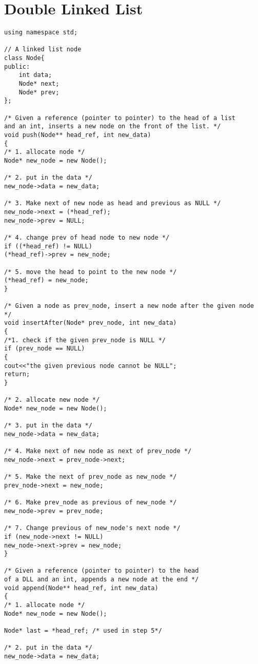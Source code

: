 \section{Double Linked List}
\begin{lstlisting}
using namespace std;

// A linked list node 
class Node{ 
public:
	int data; 
	Node* next; 
	Node* prev; 
}; 

/* Given a reference (pointer to pointer) to the head of a list 
and an int, inserts a new node on the front of the list. */
void push(Node** head_ref, int new_data) 
{ 
/* 1. allocate node */
Node* new_node = new Node(); 

/* 2. put in the data */
new_node->data = new_data; 

/* 3. Make next of new node as head and previous as NULL */
new_node->next = (*head_ref); 
new_node->prev = NULL; 

/* 4. change prev of head node to new node */
if ((*head_ref) != NULL) 
(*head_ref)->prev = new_node; 

/* 5. move the head to point to the new node */
(*head_ref) = new_node; 
} 

/* Given a node as prev_node, insert a new node after the given node */
void insertAfter(Node* prev_node, int new_data) 
{ 
/*1. check if the given prev_node is NULL */
if (prev_node == NULL) 
{ 
cout<<"the given previous node cannot be NULL"; 
return; 
} 

/* 2. allocate new node */
Node* new_node = new Node();

/* 3. put in the data */
new_node->data = new_data; 

/* 4. Make next of new node as next of prev_node */
new_node->next = prev_node->next; 

/* 5. Make the next of prev_node as new_node */
prev_node->next = new_node; 

/* 6. Make prev_node as previous of new_node */
new_node->prev = prev_node; 

/* 7. Change previous of new_node's next node */
if (new_node->next != NULL) 
new_node->next->prev = new_node; 
} 

/* Given a reference (pointer to pointer) to the head 
of a DLL and an int, appends a new node at the end */
void append(Node** head_ref, int new_data) 
{ 
/* 1. allocate node */
Node* new_node = new Node(); 

Node* last = *head_ref; /* used in step 5*/

/* 2. put in the data */
new_node->data = new_data; 


\end{lstlisting}
